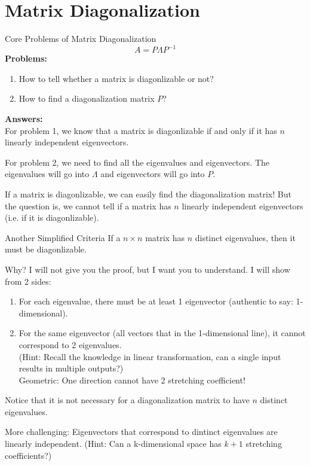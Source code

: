 \documentclass{beamer}
\begin{document}
\section{Matrix Diagonalization}
\begin{frame}{Core Problems of Matrix Diagonalization}
    \begin{equation*}
        A=P\varLambda P^{-1}
    \end{equation*}
\textbf{Problems:}
\begin{enumerate}
    \item How to tell whether a matrix is diagonlizable or not?
    \item How to find a diagonalization matrix $P$?
\end{enumerate}

\textbf{Answers:}\\
\vspace{3pt}
For problem 1, we know that a matrix is diagonlizable if and only if it has $n$ linearly independent eigenvectors.

\vspace{3pt}
For problem 2, we need to find all the eigenvalues and eigenvectors. The eigenvalues will go into $\varLambda$ and eigenvectors will go into $P$.

\vspace{5pt}
If a matrix is diagonlizable, we can easily find the diagonalization matrix! But the question is, we cannot tell if a matrix has $n$ linearly independent eigenvectors (i.e. if it is diagonlizable).
\end{frame}

\begin{frame}{Another Simplified Criteria}
If a $n\times n$ matrix has $n$ distinct eigenvalues, then it must be diagonlizable.

\vspace{3pt}
Why? I will not give you the proof, but I want you to understand. I will show from 2 sides:

\begin{enumerate}
    \item For each eigenvalue, there must be at least 1 eigenvector (authentic to say: 1-dimensional).
    \item For the same eigenvector (all vectors that in the 1-dimensional line), it cannot correspond to 2 eigenvalues.\\
    (Hint: Recall the knowledge in linear transformation, can a single input results in multiple outputs?)\\
    Geometric: One direction cannot have 2 stretching coefficient!
\end{enumerate}

Notice that it is not necessary for a diagonalization matrix to have $n$ distinct eigenvalues.

\vspace{3pt}
More challenging: Eigenvectors that correspond to dintinct eigenvalues are linearly independent. (Hint: Can a k-dimensional space has $k+1$ stretching coefficients?)

\end{frame}
\end{document}
